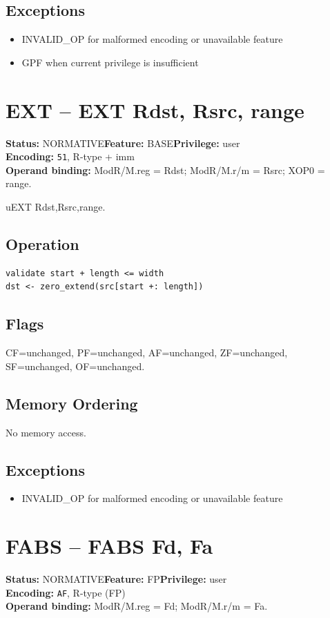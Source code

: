 \documentclass[10pt]{article}
\begin{document}
\subsection*{Exceptions}
\begin{itemize}
\item INVALID\_OP for malformed encoding or unavailable feature
\item GPF when current privilege is insufficient
\end{itemize}
\clearpage

\section{EXT -- EXT Rdst, Rsrc, range}
\textbf{Status:} NORMATIVE\quad \textbf{Feature:} BASE\quad \textbf{Privilege:} user\\
\textbf{Encoding:} \texttt{51}, R-type + imm\\
\textbf{Operand binding:} ModR/M.reg = Rdst; ModR/M.r/m = Rsrc; XOP0 = range.

uEXT Rdst,Rsrc,range.

\subsection*{Operation}
\begin{lstlisting}
validate start + length <= width
dst <- zero_extend(src[start +: length])
\end{lstlisting}
\subsection*{Flags}
CF=unchanged, PF=unchanged, AF=unchanged, ZF=unchanged, SF=unchanged, OF=unchanged.
\subsection*{Memory Ordering}
No memory access.
\subsection*{Exceptions}
\begin{itemize}
\item INVALID\_OP for malformed encoding or unavailable feature
\end{itemize}
\clearpage

\section{FABS -- FABS Fd, Fa}
\textbf{Status:} NORMATIVE\quad \textbf{Feature:} FP\quad \textbf{Privilege:} user\\
\textbf{Encoding:} \texttt{AF}, R-type (FP)\\
\textbf{Operand binding:} ModR/M.reg = Fd; ModR/M.r/m = Fa.
\end{document}
